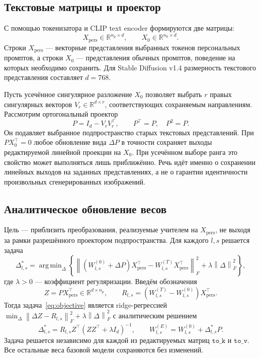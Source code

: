 \documentclass{article}
\newcommand{\Xp}{X_{\mathrm{pers}}}
\newcommand{\Xo}{X_{0}}
\newcommand{\Wbase}{W^{(0)}}
\newcommand{\Wteach}{W^{(T)}}
\newcommand{\Wedit}{W^{(E)}}
\newcommand{\Fnorm}[1]{\left\lVert #1\right\rVert_{F}}
\DeclareMathOperator*{\argmin}{arg\,min}
\begin{document}
\subsection{Текстовые матрицы и проектор}

С помощью токенизатора и CLIP text encoder формируются две матрицы:
\begin{equation}\label{eq:text-matrices}
    \Xp\in\mathbb{R}^{n_p\times d},\qquad
    \Xo\in\mathbb{R}^{n_0\times d}.
\end{equation}
Строки $\Xp$ --- векторные представления выбранных токенов персональных
промптов, а строки $\Xo$ --- представления обычных промптов, поведение
на которых необходимо сохранить. Для Stable Diffusion v1.4 размерность
текстового представления составляет $d=768$.

Пусть усечённое сингулярное разложение $\Xo$ позволяет выбрать
$r$ правых сингулярных векторов $V_r\in\mathbb{R}^{d\times r}$,
соответствующих сохраняемым направлениям. Рассмотрим ортогональный проектор
\begin{equation}\label{eq:projector}
    P=I_d-V_rV_r^{\top},\qquad P^{\top}=P,\quad P^2=P.
\end{equation}
Он подавляет выбранное подпространство старых текстовых представлений.
При $P\Xo^\top=0$ любое обновление вида $\Delta P$ в точности
сохраняет выходы редактируемой линейной проекции на $\Xo$.
При усечённом выборе ранга это свойство может выполняться лишь
приближённо. Речь идёт именно о сохранении линейных выходов на
заданных представлениях, а не о гарантии идентичности произвольных
сгенерированных изображений.

\subsection{Аналитическое обновление весов}\label{sec:method}

Цель --- приблизить преобразования, реализуемые учителем на $\Xp$,
не выходя за рамки разрешённого проектором подпространства.
Для каждого $l,s$ решается задача
\begin{equation}\label{eq:objective}
\Delta_{l,s}^{*}=\argmin_{\Delta}
\left\{
  \Fnorm{(\Wbase_{l,s}+\Delta P)\Xp^\top
    -\Wteach_{l,s}\Xp^\top}^{2}
  +\lambda\Fnorm{\Delta}^{2}
\right\},
\end{equation}
где $\lambda>0$ --- коэффициент регуляризации.
Введём обозначения
\begin{equation}\label{eq:zr}
    Z=P\Xp^\top\in\mathbb{R}^{d\times n_p},\qquad
    R_{l,s}=(\Wteach_{l,s}-\Wbase_{l,s})\Xp^\top.
\end{equation}
Тогда задача~\eqref{eq:objective} является ridge-регрессией
$\min_\Delta\Fnorm{\Delta Z-R_{l,s}}^2+\lambda\Fnorm{\Delta}^2$
с аналитическим решением
\begin{equation}\label{eq:solution}
    \Delta_{l,s}^{*}
    =R_{l,s}Z^{\top}(ZZ^{\top}+\lambda I_d)^{-1},
    \qquad
    \Wedit_{l,s}=\Wbase_{l,s}+\Delta_{l,s}^{*}P.
\end{equation}
Задача решается независимо для каждой из редактируемых матриц
$\texttt{to\_k}$ и $\texttt{to\_v}$. Все остальные веса базовой модели
сохраняются без изменений.
\end{document}
